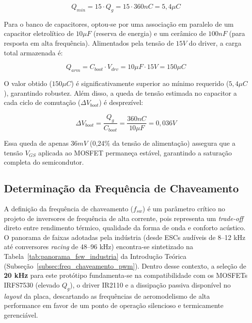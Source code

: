 \begin{equation}
    Q_{min} = 15 \cdot Q_g = 15 \cdot 360nC = 5,4 \mu C
\end{equation}

Para o banco de capacitores, optou-se por uma associação em paralelo de um capacitor eletrolítico de $10\mu F$ (reserva de energia) e um cerâmico de $100nF$ (para resposta em alta frequência). Alimentados pela tensão de $15V$ do driver, a carga total armazenada é:

\begin{equation}
    Q_{arm} = C_{boot} \cdot V_{drv} = 10\mu F \cdot 15V = 150 \mu C
\end{equation}

O valor obtido ($150 \mu C$) é significativamente superior ao mínimo requerido ($5,4 \mu C$), garantindo robustez. Além disso, a queda de tensão estimada no capacitor a cada ciclo de comutação ($\Delta V_{boot}$) é desprezível:

\begin{equation}
    \Delta V_{boot} = \frac{Q_g}{C_{boot}} = \frac{360nC}{10\mu F} = 0,036V
\end{equation}

Essa queda de apenas $36mV$ (0,24\% da tensão de alimentação) assegura que a tensão $V_{GS}$ aplicada ao MOSFET permaneça estável, garantindo a saturação completa do semicondutor.

\subsection{Determinação da Frequência de Chaveamento}
\label{subsec:determinacao_fsw}

A definição da frequência de chaveamento ($f_{sw}$) é um parâmetro crítico no projeto de inversores de frequência de alta corrente, pois representa um \textit{trade-off} direto entre rendimento térmico, qualidade da forma de onda e conforto acústico. O panorama de faixas adotadas pela indústria (desde ESCs audíveis de 8--12 kHz até conversores \textit{racing} de 48--96 kHz) encontra-se sintetizado na Tabela~\ref{tab:panorama_fsw_industria} da Introdução Teórica (Subseção~\ref{subsec:freq_chaveamento_pwm}). Dentro desse contexto, a seleção de \textbf{20 kHz} para este protótipo fundamenta-se na compatibilidade com os MOSFETs IRFS7530 (elevado $Q_g$), o driver IR2110 e a dissipação passiva disponível no \textit{layout} da placa, descartando as frequências de aeromodelismo de alta performance em favor de um ponto de operação silencioso e termicamente gerenciável.

